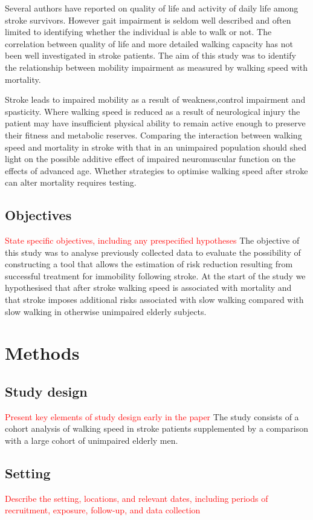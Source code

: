 \documentclass[a4paper,12pt]{article}
\begin{document}
Several authors have reported on quality of life and activity of daily life among stroke survivors. However gait impairment is seldom well described and often limited to identifying whether the individual is able to walk or not. The correlation between quality of life and more detailed walking capacity has not been well investigated in stroke patients\cite{King1996a,Loewen1990,Viitanen1988a}.
The aim of this study was to identify the relationship between mobility impairment as measured by walking speed with mortality. 
\par
Stroke leads to impaired mobility as a result of weakness,control impairment and spasticity. Where walking speed is reduced as a result of neurological injury the patient may have insufficient physical ability to remain active enough to preserve their fitness and metabolic reserves. Comparing the interaction between walking speed and mortality in stroke with that in an unimpaired population should shed light on the possible additive effect of impaired neuromuscular function on the effects of advanced age. Whether strategies to optimise walking speed after stroke can alter mortality requires testing.
\subsection{Objectives} \textcolor{red}{ State specific objectives, including any prespecified hypotheses} The objective of this study was to analyse previously collected data to evaluate the possibility of constructing a tool that allows the estimation of risk reduction resulting from successful treatment for immobility following stroke. At the start of the study we hypothesised that after stroke walking speed is associated with mortality and that stroke imposes additional risks associated with slow walking compared with slow walking in otherwise unimpaired elderly subjects.
\section{Methods}
\subsection{Study design} \textcolor{red}{ Present key elements of study design early in the paper} The study consists of a cohort analysis of walking speed in stroke patients supplemented by a comparison with a large cohort of unimpaired elderly men. 
\subsection{Setting} \textcolor{red}{ Describe the setting, locations, and relevant dates, including periods of recruitment, exposure, follow-up, and data collection} 
\end{document}
